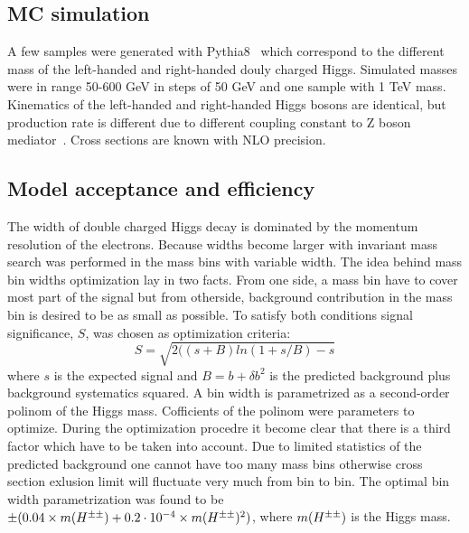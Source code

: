 \subsection{MC simulation}
A few samples were generated with Pythia8~\cite{???} which correspond to the different mass of the left-handed and right-handed douly charged Higgs.
Simulated masses were in range 50-600 GeV in steps of 50 GeV and one sample with 1 TeV mass.
Kinematics of the left-handed and right-handed Higgs bosons are identical, but production rate is different due to different coupling constant to Z boson mediator~\cite{dch_note}.
Cross sections are known with NLO precision.

\subsection{Model acceptance and efficiency}
The width of double charged Higgs decay is dominated by the momentum resolution of the electrons.
Because widths become larger with invariant mass search was performed in the mass bins with variable width.
The idea behind mass bin widths optimization lay in two facts. From one side, a mass bin have to cover most part of the signal
but from otherside, background contribution in the mass bin is desired to be as small as possible.
To satisfy both conditions signal significance, $S$, was chosen as optimization criteria:
\begin{equation}
 S = \sqrt{ 2((s+B)ln(1+s/B)-s } 
\end{equation}
where $s$ is the expected signal and $B=b+\delta b^2$ is the predicted background plus background systematics squared.
A bin width is parametrized as a second-order polinom of the Higgs mass.
Cofficients of the polinom were parameters to optimize.
During the optimization procedre it become clear that there is a third factor which have to be taken into account.
Due to limited statistics of the predicted background one cannot have too many mass bins otherwise cross section
exlusion limit will fluctuate very much from bin to bin. 
The optimal bin width parametrization was found to be $\pm(0.04 \times m(H^{\pm\pm}) + 0.2 \cdot 10^{-4} \times m(H^{\pm\pm})^{2})$,
where $m(H^{\pm\pm})$ is the Higgs mass.

